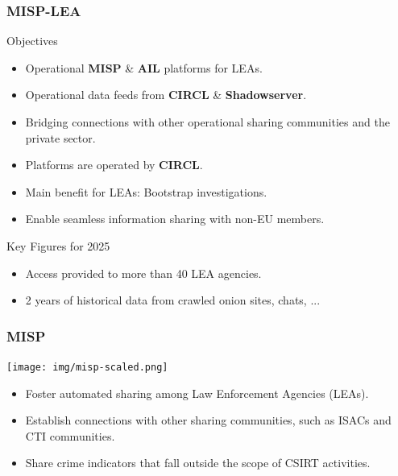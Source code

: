 \begin{frame}
\frametitle{MISP-LEA}
\begin{block}{Objectives}
    \begin{itemize}
        \item Operational \textbf{MISP} \& \textbf{AIL} platforms for LEAs.
        \item Operational data feeds from \textbf{CIRCL} \& \textbf{Shadowserver}.
        \item Bridging connections with other operational sharing communities and the private sector.
        \item Platforms are operated by \textbf{CIRCL}.
        \item Main benefit for LEAs: \alert{Bootstrap investigations}.
        \item Enable seamless information sharing with non-EU members.
    \end{itemize}
\end{block}

\begin{block}{Key Figures for 2025}
    \begin{itemize}
        \item Access provided to more than 40 LEA agencies.
        \item 2 years of historical data from crawled onion sites, chats, ...
    \end{itemize}
\end{block}
\end{frame}

\begin{frame}
    \frametitle{MISP}
    \begin{minipage}{0.45\textwidth} %
        \texttt{[image: img/misp-scaled.png]}
    \end{minipage}%
    \hfill
    \begin{minipage}{0.45\textwidth} %
        \begin{itemize}
            \item Foster automated sharing among Law Enforcement Agencies (LEAs).
            \item Establish connections with other sharing communities, such as ISACs and CTI communities.
            \item Share crime indicators that fall outside the scope of CSIRT activities.
        \end{itemize}
    \end{minipage}
\end{frame}

